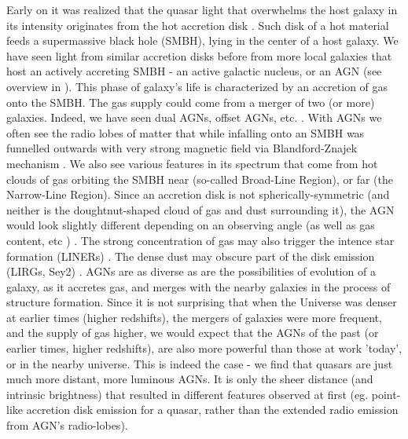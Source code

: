 \documentclass[modern]{aastex62}
\begin{document}
Early on it was realized that the quasar light that overwhelms the host galaxy in its intensity originates from the hot accretion disk \citep{oke1965, burbidge1967}.  Such disk of a hot material feeds a supermassive black hole (SMBH), lying in the center of a host galaxy. We have seen light from similar accretion disks before from more local galaxies that host an actively accreting SMBH  - an active galactic nucleus, or an AGN (see overview in \cite{netzer2013}). This phase of galaxy's life is characterized by an accretion of gas onto the SMBH. The gas supply could come from a merger of two (or more) galaxies. Indeed, we have seen dual AGNs, offset AGNs, etc. \citep{kormendy2013, muller2016}. With AGNs we often see the radio lobes of matter that while infalling onto an SMBH was funnelled outwards with very strong magnetic field via Blandford-Znajek mechanism \citep{blandford1977}. We also see various features in its spectrum that come from hot clouds of gas orbiting the SMBH near (so-called Broad-Line Region), or far (the Narrow-Line Region). Since an accretion disk is not spherically-symmetric (and neither is the doughtnut-shaped cloud of gas and dust surrounding it), the AGN would look slightly different depending on an observing angle  \citep{marin2017, lawrence2016a} (as well as gas content, etc \cite{veilleux2016}) . The strong concentration of gas may also trigger the intence star formation (LINERs) \citep{maiolino2003, mingo2016,  hernandez2016}. The dense  dust may obscure part of the disk emission (LIRGs, Sey2) \citep{symeonidis2017, lamassa2017}. AGNs are as diverse as are the possibilities of evolution of a galaxy, as it accretes gas, and merges with the nearby galaxies in the process of structure formation. Since it is not surprising that when the Universe was denser at earlier times (higher redshifts), the mergers of galaxies were more frequent, and the supply of gas higher, we would expect that the AGNs of the past (or earlier times, higher redshifts), are also more powerful than those at work 'today', or in the nearby universe. This is indeed the case - we find that quasars are just much more distant, more luminous AGNs. It is only the sheer distance (and intrinsic brightness) that resulted in different features observed at first (eg. point-like accretion disk emission for a quasar, rather than the extended radio emission from AGN's radio-lobes). 


\end{document}

